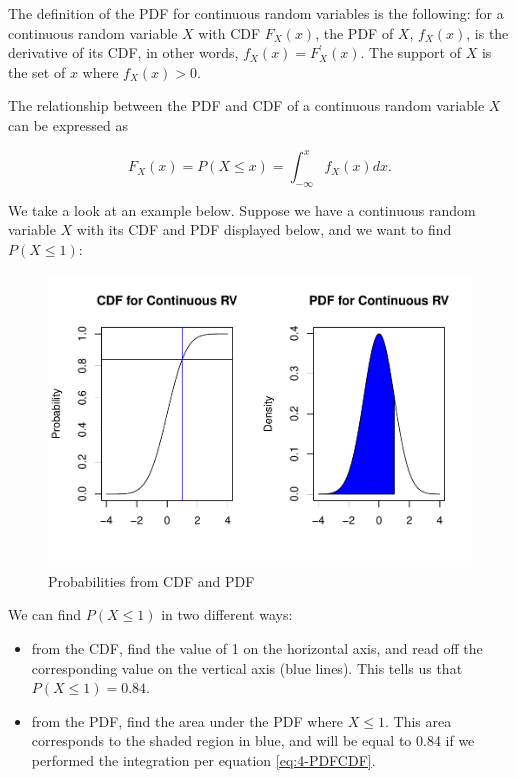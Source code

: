 \documentclass[
]{book}
\providecommand{\tightlist}{%
  \setlength{\itemsep}{0pt}\setlength{\parskip}{0pt}}
\begin{document}
The definition of the PDF for continuous random variables is the following: for a continuous random variable \(X\) with CDF \(F_X(x)\), the PDF of \(X\), \(f_X(x)\), is the derivative of its CDF, in other words, \(f_X(x) = F_X^{\prime}(x)\). The support of \(X\) is the set of \(x\) where \(f_X(x) >0\).

The relationship between the PDF and CDF of a continuous random variable \(X\) can be expressed as

\begin{equation} 
F_X(x) = P(X \leq x) = \int_{-\infty}^{x} f_X(x) dx.
\label{eq:4-PDFCDF}
\end{equation}

We take a look at an example below. Suppose we have a continuous random variable \(X\) with its CDF and PDF displayed below, and we want to find \(P(X \leq 1)\):

\begin{figure}
\centering
\includegraphics{bookdown-demo_files/figure-latex/4-prob-1.pdf}
\caption{\label{fig:4-prob}Probabilities from CDF and PDF}
\end{figure}

We can find \(P(X \leq 1)\) in two different ways:

\begin{itemize}
\tightlist
\item
  from the CDF, find the value of 1 on the horizontal axis, and read off the corresponding value on the vertical axis (blue lines). This tells us that \(P(X \leq 1) = 0.84\).
\item
  from the PDF, find the area under the PDF where \(X \leq 1\). This area corresponds to the shaded region in blue, and will be equal to 0.84 if we performed the integration per equation \eqref{eq:4-PDFCDF}.
\end{itemize}
\end{document}
